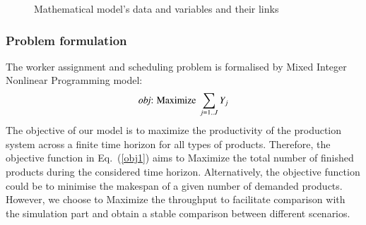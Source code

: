 \documentclass[review,12pt, 3p, times]{elsarticle}
\begin{document}
\begin{figure}[htbp]
	\centering
	\caption{Mathematical model's data and variables and their links}
	\label{fig:ModelVariablesLinks2}
\end{figure}
					
					              
\subsubsection{Problem formulation}
The  worker assignment and scheduling problem is formalised by Mixed Integer Nonlinear Programming  model:
\begin{equation}
	\text{{\it obj}: Maximize } \sum_{j=1..J}Y_j\label{obj1}
\end{equation} 		
The objective of our model is to maximize the productivity of the production system across a finite time horizon for all types of products. Therefore, the objective function in Eq.~(\ref{obj1}) aims to Maximize the total number of finished products during the considered time horizon. Alternatively, the objective function could be to minimise the makespan of a given number of demanded products. However, we choose to Maximize the throughput to facilitate comparison with the simulation part and obtain a stable comparison between different scenarios.
	
\end{document}
